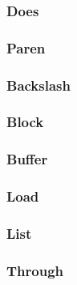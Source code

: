 \subsubsection{Does}

\subsubsection{Paren}
\subsubsection{Backslash}

\subsubsection{Block}
\subsubsection{Buffer}
\subsubsection{Load}
\subsubsection{List}
\subsubsection{Through}

